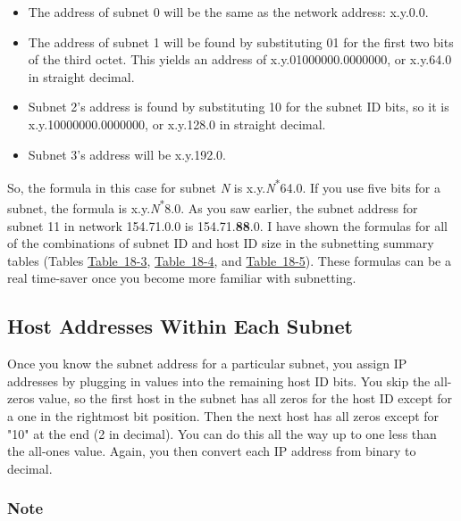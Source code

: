 \documentclass[b5paper,11pt]{memoir}
\begin{document}
\begin{itemize}
\item
  The address of subnet 0 will be the same as the network address:
  x.y.0.0.
\item
  The address of subnet 1 will be found by substituting 01 for the first
  two bits of the third octet. This yields an address of
  x.y.01000000.0000000, or x.y.64.0 in straight decimal.
\item
  Subnet 2's address is found by substituting 10 for the subnet ID bits,
  so it is x.y.10000000.0000000, or x.y.128.0 in straight decimal.
\item
  Subnet 3's address will be x.y.192.0.
\end{itemize}

So, the formula in this case for subnet {\emph{N}} is
x.y.{\emph{N}}\textsuperscript{*}64.0. If you use five bits for a
subnet, the formula is x.y.{\emph{N}}\textsuperscript{*}8.0. As you saw
earlier, the subnet address for subnet 11 in network 154.71.0.0 is
154.71.{\textbf{88}}.0. I have shown the formulas for all of the
combinations of subnet ID and host ID size in the subnetting summary
tables (Tables
\protect\hyperlink{ch18s07.htmlux5cux23subnetting_summary_table_for_class_a_net}{Table~18-3},
\protect\hyperlink{ch18s07.htmlux5cux23subnetting_summary_table_for_class_b_net}{Table~18-4},
and
\protect\hyperlink{ch18s07.htmlux5cux23subnetting_summary_table_for_class_c_net}{Table~18-5}).
These formulas can be a real time-saver once you become more familiar
with subnetting.

\subsection[Host Addresses Within Each
Subnet]{\texorpdfstring{\protect\hypertarget{ch18s06.htmlux5cux23host_addresses_within_each_subnet}{}{}Host
Addresses Within Each Subnet}{Host Addresses Within Each Subnet}}

Once you know the subnet address for a particular subnet, you assign IP
addresses by plugging in values into the remaining host ID bits. You
skip the all-zeros value, so the first host in the subnet has all zeros
for the host ID except for a one in the rightmost bit position. Then the
next host has all zeros except for "10" at the end (2 in decimal). You
can do this all the way up to one less than the all-ones value. Again,
you then convert each IP address from binary to decimal.

\subsubsection[Note]{\texorpdfstring{\protect\hypertarget{ch18s06.htmlux5cux23note-74}{}{}Note}{Note}}
\end{document}
